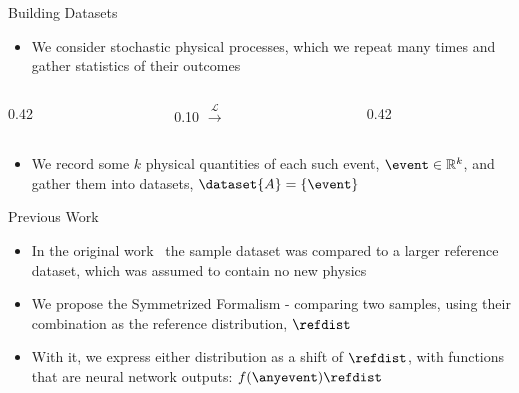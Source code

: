 \documentclass[notheorems]{beamer}
\begin{document}
\begin{frame}{Building Datasets}
    \begin{itemize}
        \item We consider stochastic physical processes, which we repeat many times and gather statistics of their outcomes
    \end{itemize}

    \begin{center}
    \begin{columns}[c]

        \begin{column}{0.42\textwidth}
            \centering
        \end{column}

        \begin{column}{0.10\textwidth}
            \centering
            {\Huge $\xrightarrow{\mathcal{L}}$}
        \end{column}

        \begin{column}{0.42\textwidth}
            \centering
        \end{column}

    \end{columns}
    \end{center}
    \begin{itemize}
        \item We record some $k$ physical quantities of each such event, $\event \in \mathbb{R}^k$, and gather them into datasets, $\dataset{A} = \{\event\}$
    \end{itemize}
\end{frame}

\begin{frame}{Previous Work}
    \begin{itemize}
        \item In the original work~ the sample dataset was compared to a larger reference dataset, which was assumed to contain no new physics
        \item We propose the Symmetrized Formalism - comparing two samples, using their combination as the reference distribution, $\refdist$
        \item With it, we express either distribution as a shift of $\refdist$, with functions that are neural network outputs: $f(\anyevent) \refdist$
    \end{itemize}
\end{frame}
\end{document}
